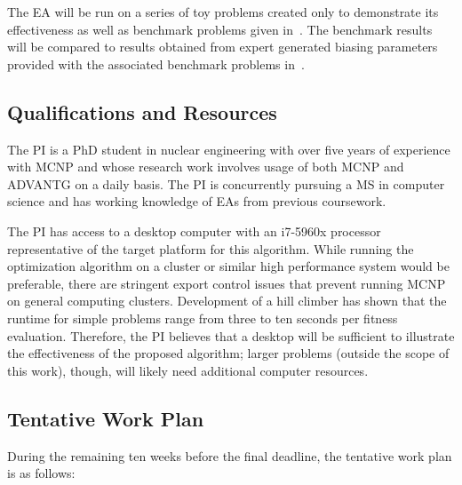 \documentclass{article}
\begin{document}
The EA will be run on a series of toy problems created only to demonstrate its effectiveness as well as benchmark problems given in~\cite{ref:Mosher2015}. The benchmark results will be compared to results obtained from expert generated biasing parameters provided with the associated benchmark problems in~\cite{ref:Mosher2015}.


\subsection{Qualifications and Resources}\label{sec:b4}
The PI is a PhD student in nuclear engineering with over five years of experience with MCNP and whose research work involves usage of both MCNP and ADVANTG on a daily basis. The PI is concurrently pursuing a MS in computer science and has working knowledge of EAs from previous coursework.

The PI has access to a desktop computer with an i7-5960x processor representative of the target platform for this algorithm. While running the optimization algorithm on a cluster or similar high performance system would be preferable, there are stringent export control issues that prevent running MCNP on general computing clusters. Development of a hill climber has shown that the runtime for simple problems range from three to ten seconds per fitness evaluation. Therefore, the PI believes that a desktop will be sufficient to illustrate the effectiveness of the proposed algorithm; larger problems (outside the scope of this work), though, will likely need additional computer resources.

\subsection{Tentative Work Plan}\label{sec:b5}
During the remaining ten weeks before the final deadline, the tentative work plan is as follows:
\end{document}

